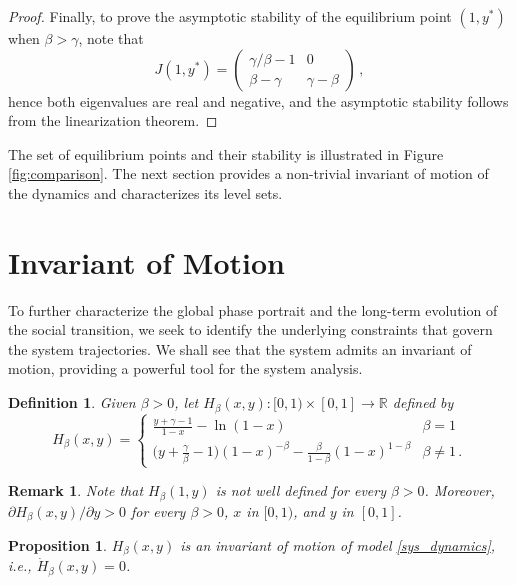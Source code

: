 \documentclass{article}
\newcommand{\R}{\mathbb R}
\newtheorem{definition}{Definition}[section]
\newtheorem{proposition}[theorem]{Proposition}
\newtheorem{remark}{Remark}[section]
\begin{document}
\begin{proof}
        Finally, to prove the asymptotic stability of the equilibrium point $(1,y^*)$ when $\beta > \gamma$, note that
        $$
        J(1,y^*) = \begin{pmatrix}
        	\gamma/\beta - 1 & 0 \\
        	\beta - \gamma & \gamma - \beta
        \end{pmatrix}\,,
        $$ 
        hence both eigenvalues are real and negative, and the asymptotic stability follows from the linearization theorem.
\end{proof}

The set of equilibrium points and their stability is illustrated in Figure \ref{fig:comparison}. The next section provides a non-trivial invariant of motion of the dynamics and characterizes its level sets.
\section{Invariant of Motion}\label{sec:H}

To further characterize the global phase portrait and the long-term evolution of the social transition, we seek to identify the underlying constraints that govern the system trajectories. We shall see that the system admits an invariant of motion, providing a powerful tool for the system analysis.

\begin{definition}
Given $\beta>0$, let $H_{\beta}(x, y): [0,1) \times [0,1] \to \R$ defined by
$$H_{\beta}(x,y) = 
    \begin{cases}
        \displaystyle\frac{y + \gamma - 1}{1 - x} - \ln(1 - x) & \beta = 1 \\[7pt]
        \Big(y + \displaystyle\frac{\gamma}{\beta} - 1\Big)(1 - x)^{- \beta} - \frac{\beta}{1 - \beta}(1 - x)^{1 - \beta} & \beta \neq 1\,.
    \end{cases}$$ 
\end{definition}

\begin{remark}\label{remark:H}
    Note that $H_{\beta}(1,y)$ is not well defined for every $\beta > 0$. Moreover, $\partial H_\beta(x,y) / \partial y > 0$ for every $\beta > 0$, $x$ in $[0,1)$, and $y$ in $[0,1]$.
\end{remark}

\begin{proposition}\label{prop:H}
    $H_{\beta}(x,y)$ is an invariant of motion of model \eqref{sys_dynamics}, i.e., $\dot H_\beta(x,y) = 0$.
\end{proposition}
\end{document}
